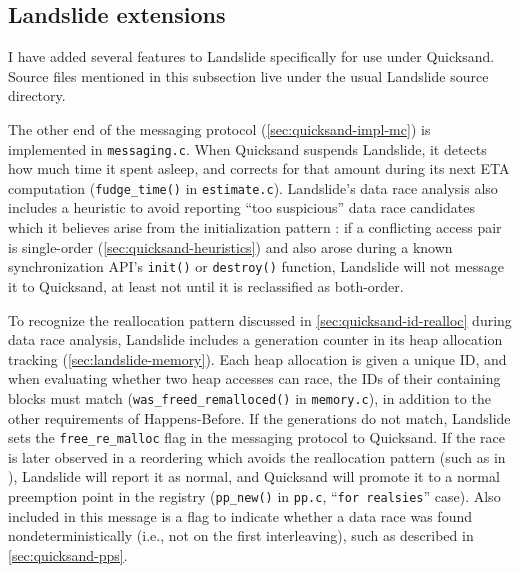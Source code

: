 \subsection{Landslide extensions}
\label{sec:quicksand-impl-landslide}

I have added several features to Landslide specifically for use under Quicksand.
Source files mentioned in this subsection live under the usual Landslide source directory.

The other end of the messaging protocol (\cref{sec:quicksand-impl-mc})
is implemented in {\tt messaging.c}.
When Quicksand suspends Landslide,
it detects how much time it spent asleep,
and corrects for that amount during its next ETA computation ({\tt fudge\_time()} in {\tt estimate.c}).
Landslide's data race analysis also includes a heuristic to avoid reporting ``too suspicious''
data race candidates which it believes arise from the initialization pattern \cite{eraser}:
if a conflicting access pair is single-order (\cref{sec:quicksand-heuristics})
and also arose during a known synchronization API's {\tt init()} or {\tt destroy()} function,
Landslide will not message it to Quicksand,
at least not until it is reclassified as both-order.

To recognize the reallocation pattern
discussed in \cref{sec:quicksand-id-realloc}
during data race analysis,
Landslide includes a generation counter in its heap allocation tracking (\cref{sec:landslide-memory}).
Each heap allocation is given a unique ID,
and when evaluating whether two heap accesses can race,
the IDs of their containing blocks must match
({\tt was\_freed\_remalloced()} in {\tt memory.c}),
in addition to the other requirements of Happens-Before.
If the generations do not match,
Landslide sets the {\tt free\_re\_malloc} flag in the messaging protocol to Quicksand.
If the race is later observed in a reordering which avoids the reallocation pattern
(such as in ),
Landslide will report it as normal,
and Quicksand will promote it to a normal preemption point in the registry
({\tt pp\_new()} in {\tt pp.c}, ``{\tt for realsies}'' case).
Also included in this message is a flag to indicate whether a data race was found
nondeterministically (i.e., not on the first interleaving), such as described in \cref{sec:quicksand-pps}.

